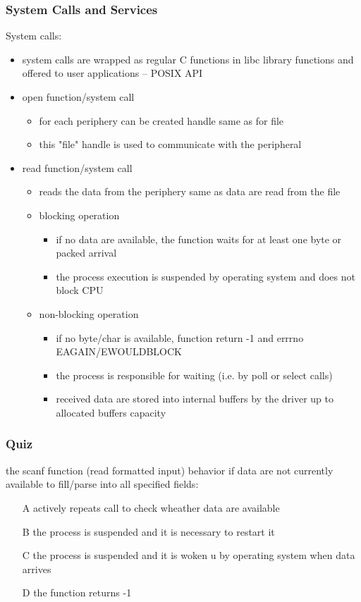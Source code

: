 \documentclass{beamer}
\begin{document}
\begin{frame}
\frametitle{System Calls and Services}

System calls:
\begin{itemize}
\item system calls are wrapped as regular C functions in libc library functions and offered to user applications -- POSIX API
\item open function/system call
    \begin{itemize}
    \item for each periphery can be created handle same as for file
    \item this "file" handle is used to communicate with the peripheral
    \end{itemize}
\item read function/system call
    \begin{itemize}
    \item reads the data from the periphery same as data are read from the file
    \item blocking operation
        \begin{itemize}
        \item if no data are available, the function waits for at least one byte or packed arrival
        \item the process execution is suspended by operating system and does not block CPU
        \end{itemize}
    \item non-blocking operation
        \begin{itemize}
        \item if no byte/char is available, function return -1 and errrno EAGAIN/EWOULDBLOCK
        \item the process is responsible for waiting (i.e. by poll or select calls)
        \item received data are stored into internal buffers by the driver up to allocated buffers capacity
        \end{itemize}
    \end{itemize}
\end{itemize}
\end{frame}





\begin{frame}
\frametitle{Quiz}

the scanf function (read formatted input) behavior if data are not currently available to fill/parse into all specified fields:

\begin{itemize}
\item[A] actively repeats call to check wheather data are available
\item[B] the process is suspended and it is necessary to restart it
\item[C] the process is suspended and it is woken u by operating system when data arrives
\item[D] the function returns -1
\end{itemize}
\end{frame}
\end{document}
